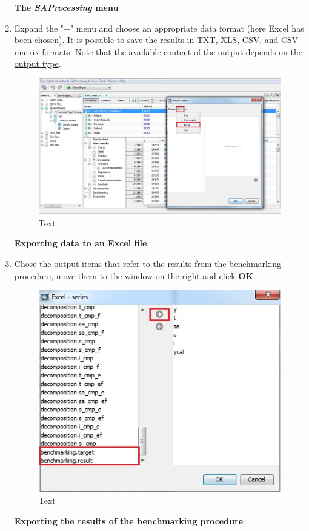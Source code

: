 \documentclass[
  letterpaper,
  DIV=11,
  numbers=noendperiod]{scrreprt}
\begin{document}
\begin{enumerate}
  \textbf{The \emph{SAProcessing} menu}
\item
  Expand the "+" menu and choose an appropriate data format (here Excel
  has been chosen). It is possible to save the results in TXT, XLS, CSV,
  and CSV matrix formats. Note that the
  \href{../theory/output.html}{available content of the output depends
  on the output type}.

  \begin{figure}

  {\centering \includegraphics{./All_images/UG_SSA_image29.jpg}

  }

  \caption{Text}

  \end{figure}

  \textbf{Exporting data to an Excel file}
\item
  Chose the output items that refer to the results from the benchmarking
  procedure, move them to the window on the right and click \textbf{OK}.

  \begin{figure}

  {\centering \includegraphics{./All_images/UDimage4.jpg}

  }

  \caption{Text}

  \end{figure}

  \textbf{Exporting the results of the benchmarking procedure}
\end{enumerate}
\end{document}

